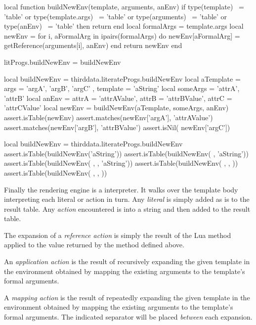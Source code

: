 {{\startLuaCode
local function buildNewEnv(template, arguments, anEnv)
  if type(template)      ~= 'table' or
     type(template.args) ~= 'table' or
     type(arguments)     ~= 'table' or
     type(anEnv)         ~= 'table' then
    return { }
  end
  local formalArgs = template.args
  local newEnv = { }
  for i, aFormalArg in ipairs(formalArgs) do
    newEnv[aFormalArg] = getReference(arguments[i], anEnv)
  end
  return newEnv
end

litProgs.buildNewEnv = buildNewEnv
\stopLuaCode

\startLuaTest
local buildNewEnv = thirddata.literateProgs.buildNewEnv
local aTemplate = { 
  args = { 'argA', 'argB', 'argC' }, 
  template = 'aString'
}
local someArgs  = { 'attrA', 'attrB' }
local anEnv     = {
  attrA = 'attrAValue',
  attrB = 'attrBValue',
  attrC = 'attrCValue'
}
local newEnv = buildNewEnv(aTemplate, someArgs, anEnv)
assert.isTable(newEnv)
assert.matches(newEnv['argA'], 'attrAValue')
assert.matches(newEnv['argB'], 'attrBValue')
assert.isNil(  newEnv['argC'])
\stopLuaTest
\stopTestCase

\startLuaTest
local buildNewEnv = thirddata.literateProgs.buildNewEnv
assert.isTable(buildNewEnv('aString'))
assert.isTable(buildNewEnv( { }, 'aString'))
assert.isTable(buildNewEnv( { }, { }, 'aString'))
assert.isTable(buildNewEnv( { }, { }, { }))
assert.isTable(buildNewEnv( { { }}, { }, { }))
\stopLuaTest
\stopTestCase
\stopTestSuite

\startTestSuite[renderer]

Finally the  rendering engine is a  
interpreter. It walks over the template body interpreting each literal or 
action in turn. Any \emph{literal} is simply added as is to the result 
table. Any \emph{action} encountered is  into a string and 
then added to the result table.

The expansion of a \emph{reference action} is simply the result of the Lua 
 method applied to the value returned by the 
 method defined above. 

An \emph{application action} is the result of recursively expanding the 
given template in the environment obtained by mapping the existing 
arguments to the template's formal arguments. 

A \emph{mapping action} is the result of repeatedly expanding the given 
template in the environment obtained by mapping the existing arguments to 
the template's formal arguments. The indicated separator will be placed 
\emph{between} each expansion. 

}}

